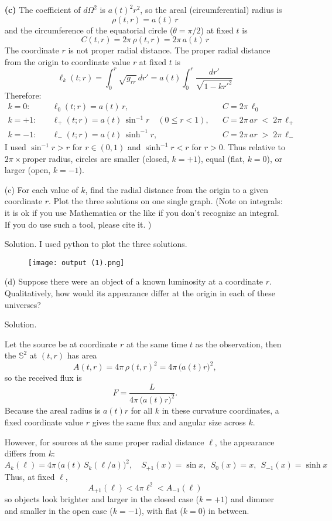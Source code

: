 \documentclass[12pt]{article}
\begin{document}
\begin{enumerate}
  \textbf{(c)}
  The coefficient of $d\Omega^2$ is $a(t)^2 r^2$, so the areal (circumferential) radius is
  \[
  \rho(t,r)=a(t)\,r
  \]
  and the circumference of the equatorial circle ($\theta=\pi/2$) at fixed $t$ is
  \[
  C(t,r)=2\pi\,\rho(t,r)=2\pi\,a(t)\,r
  \]
  The coordinate $r$ is not proper radial distance. The proper radial distance from the origin to coordinate value $r$ at fixed $t$ is
  \[
  \ell_k(t;r)=\int_0^r \sqrt{g_{rr}}\,dr' 
  = a(t)\int_0^r \frac{dr'}{\sqrt{1-k r'^2}}
  \]
  Therefore:
  \[
  \boxed{
  \begin{aligned}
  k=0:&\quad \ell_0(t;r)=a(t)\,r, && C=2\pi\,\ell_0\\[2pt]
  k=+1:&\quad \ell_{+}(t;r)=a(t)\,\sin^{-1} r\quad (0\le r<1), 
  && C=2\pi\,a r \;<\; 2\pi\,\ell_{+}\\[2pt]
  k=-1:&\quad \ell_{-}(t;r)=a(t)\,\sinh^{-1} r,
  && C=2\pi\,a r \;>\; 2\pi\,\ell_{-}
  \end{aligned}}
  \]
  I used $\sin^{-1} r>r$ for $r\in(0,1)$ and $\sinh^{-1} r<r$ for $r>0$. 
  Thus relative to $2\pi\times$proper radius, circles are smaller (closed, $k=+1$), equal (flat, $k=0$), or larger (open, $k=-1$).

    
  \item[(c)] For each value of $k$, find the radial distance from the origin to a given coordinate $r$. Plot the three solutions on one single graph. (Note on integrals: it is ok if you use Mathematica or the like if you don't recognize an integral. If you do use such a tool, please cite it. )
  
  \item[Solution.]
  I used python to plot the three solutions.
  \begin{figure}[H]
    \centering
    \texttt{[image: output (1).png]}
  \end{figure}

  
  \item[(d)] Suppose there were an object of a known luminosity at a coordinate $r$. Qualitatively, how would its appearance differ at the origin in each of these universes?
  
  \item[Solution.]
  
  Let the source be at coordinate $r$ at the same time $t$ as the observation, then the $\mathbb{S}^2$ at $(t,r)$ has area 
  \[
  A(t,r)=4\pi\,\rho(t,r)^2=4\pi\,\big(a(t)r\big)^2,
  \]
  so the received flux is 
  \[
  F=\frac{L}{4\pi\,\big(a(t)r\big)^2}.
  \]
  Because the areal radius is $a(t)r$ for all $k$ in these curvature coordinates, a fixed coordinate value $r$ gives the same flux and angular size across $k$. 

  However, for sources at the same proper radial distance $\ell$, the appearance differs from $k$:
  \[
  A_k(\ell)=4\pi\,\big(a(t)\,S_k(\ell/a)\big)^2,\quad
  S_{+1}(x)=\sin x,\ \ S_0(x)=x,\ \ S_{-1}(x)=\sinh x
  \]
  Thus, at fixed $\ell$,
  \[
  A_{+1}(\ell)<4\pi\ell^2<A_{-1}(\ell)
  \]
  so objects look brighter and larger in the closed case ($k=+1$) and dimmer and smaller in the open case ($k=-1$), with flat ($k=0$) in between. 
\end{enumerate}
\end{document}
